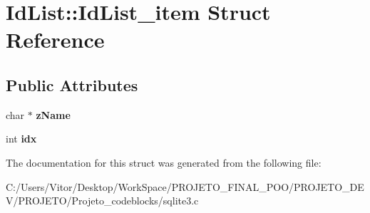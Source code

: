 \hypertarget{struct_id_list_1_1_id_list__item}{\section{Id\-List\-:\-:Id\-List\-\_\-item Struct Reference}
\label{struct_id_list_1_1_id_list__item}
}
\subsection*{Public Attributes}
\begin{DoxyCompactItemize}
\item 
\hypertarget{struct_id_list_1_1_id_list__item_acd44e1182dc46441939cd6a5d935724c}{char $\ast$ {\bfseries z\-Name}}\label{struct_id_list_1_1_id_list__item_acd44e1182dc46441939cd6a5d935724c}

\item 
\hypertarget{struct_id_list_1_1_id_list__item_a869d1a5ee03bcb018e38fae6c9ac0572}{int {\bfseries idx}}\label{struct_id_list_1_1_id_list__item_a869d1a5ee03bcb018e38fae6c9ac0572}

\end{DoxyCompactItemize}


The documentation for this struct was generated from the following file\-:\begin{DoxyCompactItemize}
\item 
C\-:/\-Users/\-Vitor/\-Desktop/\-Work\-Space/\-P\-R\-O\-J\-E\-T\-O\-\_\-\-F\-I\-N\-A\-L\-\_\-\-P\-O\-O/\-P\-R\-O\-J\-E\-T\-O\-\_\-\-D\-E\-V/\-P\-R\-O\-J\-E\-T\-O/\-Projeto\-\_\-codeblocks/sqlite3.\-c\end{DoxyCompactItemize}
